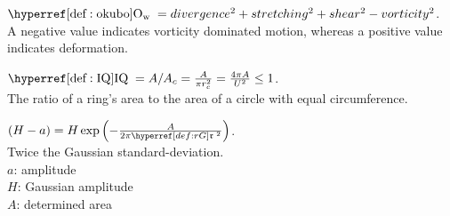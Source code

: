 \begin{multicols}{3}
\begin{definition}\label{def:okubo}
$\okubo=divergence^2+ stretching^2+ shear^2- vorticity^2$.\\
A negative value indicates vorticity dominated motion, whereas a positive value
indicates deformation.
\end{definition}

\begin{definition}\label{def:SSH}
 \end{definition}

\begin{definition}\label{def:IQ}
$\IQ=A/A_{c}=\frac{A}{\pi r^2_{c}}=\frac{4 \pi A}{U^2} \le 1$.\\
The ratio of a ring's area to the area of a circle with equal circumference.
 \end{definition}

\begin{definition}\label{def:rG}
$ \left( H-a \right) = H \exp \left( -\frac{A}{2 \pi \rG^2}  \right)$.\\
Twice the Gaussian standard-deviation. \\
$a$: amplitude\\
$H$: Gaussian amplitude\\
$A$: determined area\\
 \end{definition}


\end{multicols}

